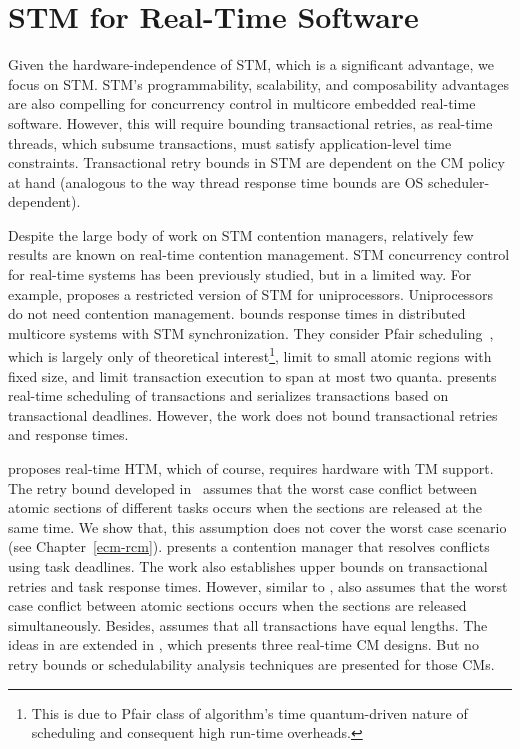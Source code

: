 \documentclass[12pt,english]{report}
\begin{document}
\section{STM for Real-Time Software}

Given the hardware-independence of STM, which is a significant advantage, we focus on STM. STM's programmability, scalability, and composability advantages are also compelling for concurrency control in multicore embedded real-time software. However, this will require bounding transactional  retries, as real-time threads, which subsume transactions, must satisfy application-level time constraints.  Transactional retry bounds in STM are dependent on the CM policy at hand (analogous to the way thread response time bounds are OS scheduler-dependent). 

Despite the large body of work on STM contention managers, relatively few results are known on real-time contention management. STM concurrency control for real-time systems has been previously studied, but in a limited way. For example, \cite{manson2006preemptible} proposes a restricted version of STM for uniprocessors. Uniprocessors do not need contention management. \cite{fahmy2009bounding} bounds response times in distributed multicore systems with STM synchronization. They consider Pfair scheduling~\cite{holman-thesis04}, which is largely only of theoretical interest\footnote{This is due to Pfair class of algorithm's time quantum-driven nature of scheduling and consequent high run-time overheads.}, limit to small atomic regions with fixed size, and limit transaction execution to span at most two quanta. \cite{sarni2009real} presents real-time scheduling of transactions and serializes transactions based on transactional deadlines. However, the work does not bound transactional retries and response times. 

\cite{schoeberl2010rttm} proposes real-time HTM, which of course, requires hardware with TM support. The retry bound developed in~\cite{schoeberl2010rttm} assumes that the worst case conflict between atomic sections of different tasks occurs when the sections are released at the same time. We show that, this assumption does not cover the worst case scenario (see Chapter~\ref{ecm-rcm}). \cite{6045438} presents a contention manager that resolves conflicts using task deadlines. The work also establishes upper bounds on transactional retries and task response times. However, similar to \cite{schoeberl2010rttm}, \cite{6045438} also assumes that the worst case conflict between atomic sections occurs when the sections are released simultaneously. Besides, \cite{6045438} assumes that all transactions have equal lengths. The ideas in \cite{6045438} are extended in \cite{barrosmanaging}, which presents three real-time CM designs. But no retry bounds or schedulability analysis techniques are presented for those CMs.
\end{document}
